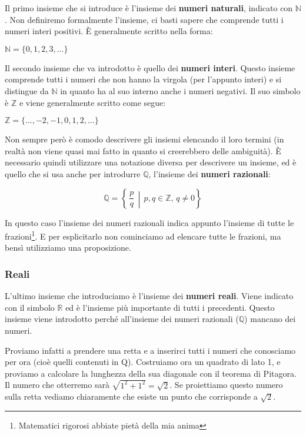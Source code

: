 Il primo insieme che si introduce è l'insieme dei \textbf{numeri naturali}, 
indicato con $\mathbb{N}$. Non definiremo formalmente l'insieme, ci basti 
sapere che comprende tutti i numeri interi positivi. È generalmente scritto 
nella forma:
\begin{center}
    $\mathbb{N} = \{0, 1, 2, 3, ...\}$
\end{center}

Il secondo insieme che va introdotto è quello dei \textbf{numeri interi}. 
Questo insieme comprende tutti i numeri che non hanno la virgola (per l'appunto 
interi) e si distingue da $\mathbb{N}$ in quanto ha al suo interno anche i 
numeri negativi. Il suo simbolo è $\mathbb{Z}$ e viene generalmente scritto 
come segue:
\begin{center}
    $\mathbb{Z} = \{..., -2, -1, 0, 1, 2, ...\}$
\end{center}

Non sempre però è comodo descrivere gli insiemi elencando il loro termini (in 
realtà non viene quasi mai fatto in quanto si creerebbero delle ambiguità). È 
necessario quindi utilizzare una notazione diversa per descrivere un insieme, 
ed è quello che si usa anche per introdurre $\mathbb{Q}$, l'insieme dei 
\textbf{numeri razionali}:
\begin{center}
    \begin{equation*}
        \mathbb{Q} = \left\{\,\dfrac{p}{q}\, \middle| \, p, q \in \mathbb{Z},\, 
        q \neq 0 \right\}
    \end{equation*}
\end{center}
In questo caso l'insieme dei numeri razionali indica appunto l'insieme di tutte 
le frazioni\footnote{Matematici rigorosi abbiate pietà della mia anima}. E per 
esplicitarlo non cominciamo ad elencare tutte le frazioni, ma bensì utilizziamo 
una proposizione.

\subsubsection{Reali}
L'ultimo insieme che introduciamo è l'insieme dei \textbf{numeri reali}. Viene 
indicato con il simbolo $\mathbb{R}$ ed è l'insieme più importante di tutti i 
precedenti. Questo insieme viene introdotto perché all'insieme dei numeri 
razionali ($\mathbb{Q}$) mancano dei numeri.

Proviamo infatti a prendere una retta e a inserirci tutti i numeri che 
conosciamo per ora (cioè quelli contenuti in Q). Costruiamo ora un quadrato di 
lato 1, e proviamo a calcolare la lunghezza della sua diagonale con il teorema 
di Pitagora. Il numero che otterremo sarà $\sqrt{1^2+1^2} = \sqrt{2}$. Se 
proiettiamo questo numero sulla retta vediamo chiaramente che esiste un punto 
che corrisponde a $\sqrt{2}$.

